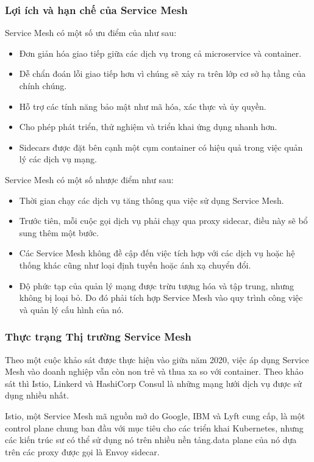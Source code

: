 \documentclass[12pt,a4paper]{report}
\begin{document}
			\subsubsection{Lợi ích và hạn chế của Service Mesh}
		\hspace{0.6cm}Service Mesh có một số ưu điểm của như sau:
		\begin{itemize}
			\item Đơn giản hóa giao tiếp giữa các dịch vụ trong cả microservice và container.
			\item Dễ chẩn đoán lỗi giao tiếp hơn vì chúng sẽ xảy ra trên lớp cơ sở hạ tầng của chính chúng.
			\item Hỗ trợ các tính năng bảo mật như mã hóa, xác thực và ủy quyền.
			\item Cho phép phát triển, thử nghiệm và triển khai ứng dụng nhanh hơn.
			\item Sidecars được đặt bên cạnh một cụm container có hiệu quả trong việc quản lý các dịch vụ mạng.
		\end{itemize}
		
		Service Mesh có một số nhược điểm như sau:
		\begin{itemize}
			\item Thời gian chạy các dịch vụ tăng thông qua việc sử dụng Service Mesh.
			\item Trước tiên, mỗi cuộc gọi dịch vụ phải chạy qua proxy sidecar, điều này sẽ bổ sung thêm một bước.
			\item Các Service Mesh không đề cập đến việc tích hợp với các dịch vụ hoặc hệ thống khác cũng như loại định tuyến hoặc ánh xạ chuyển đổi.
			\item Độ phức tạp của quản lý mạng được trừu tượng hóa và tập trung, nhưng không bị loại bỏ. Do đó phải tích hợp Service Mesh vào quy trình công việc và quản lý cấu hình của nó.
		\end{itemize}
		
			\subsubsection{Thực trạng Thị trường Service Mesh}
		\hspace{0.6cm}Theo một cuộc khảo sát được thực hiện vào giữa năm 2020, việc áp dụng Service Mesh vào doanh nghiệp vẫn còn non trẻ và thua xa so với container. Theo khảo sát thì Istio, Linkerd và HashiCorp Consul là những mạng lưới dịch vụ được sử dụng nhiều nhất.
		
		Istio, một Service Mesh mã nguồn mở do Google, IBM và Lyft cung cấp, là một control plane chung ban đầu với mục tiêu cho các triển khai Kubernetes, nhưng các kiến trúc sư có thể sử dụng nó trên nhiều nền tảng.data plane của nó dựa trên các proxy được gọi là Envoy sidecar.
		
\end{document}

